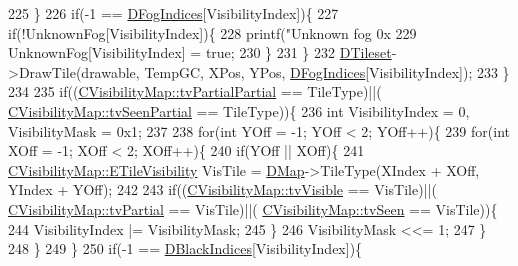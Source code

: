 \begin{DoxyCode}
225                 \}
226                 \textcolor{keywordflow}{if}(-1 == \hyperlink{classCFogRenderer_a2028e4642e756016819aab6567800af5}{DFogIndices}[VisibilityIndex])\{
227                     \textcolor{keywordflow}{if}(!UnknownFog[VisibilityIndex])\{
228                         printf(\textcolor{stringliteral}{"Unknown fog 0x%
229                         UnknownFog[VisibilityIndex] = \textcolor{keyword}{true};
230                     \}
231                 \}
232                 \hyperlink{classCFogRenderer_af9f3956c6e371f112ee1ce5decd7ae89}{DTileset}->DrawTile(drawable, TempGC, XPos, YPos, 
      \hyperlink{classCFogRenderer_a2028e4642e756016819aab6567800af5}{DFogIndices}[VisibilityIndex]);
233             \}
234             
235             \textcolor{keywordflow}{if}((\hyperlink{classCVisibilityMap_a6665f905da08825adbb0eee7bd1f2f30a75af969b6d667b802b64bacd8bca7b63}{CVisibilityMap::tvPartialPartial} == TileType)||(
      \hyperlink{classCVisibilityMap_a6665f905da08825adbb0eee7bd1f2f30a7f9292f5d7ed9e9497f8ef342c890466}{CVisibilityMap::tvSeenPartial} == TileType))\{
236                 \textcolor{keywordtype}{int} VisibilityIndex = 0, VisibilityMask = 0x1;
237                 
238                 \textcolor{keywordflow}{for}(\textcolor{keywordtype}{int} YOff = -1; YOff < 2; YOff++)\{
239                     \textcolor{keywordflow}{for}(\textcolor{keywordtype}{int} XOff = -1; XOff < 2; XOff++)\{
240                         \textcolor{keywordflow}{if}(YOff || XOff)\{
241                             \hyperlink{classCVisibilityMap_a6665f905da08825adbb0eee7bd1f2f30}{CVisibilityMap::ETileVisibility} VisTile = 
      \hyperlink{classCFogRenderer_a06be3616da23b5fce8ab3407b81788a4}{DMap}->TileType(XIndex + XOff, YIndex + YOff);
242                             
243                             \textcolor{keywordflow}{if}((\hyperlink{classCVisibilityMap_a6665f905da08825adbb0eee7bd1f2f30a3c881652ef7164aa086e595eef0ff5d6}{CVisibilityMap::tvVisible} == VisTile)||(
      \hyperlink{classCVisibilityMap_a6665f905da08825adbb0eee7bd1f2f30a0037f47075e3bde5e8e32dbd55754976}{CVisibilityMap::tvPartial} == VisTile)||(
      \hyperlink{classCVisibilityMap_a6665f905da08825adbb0eee7bd1f2f30ab7c30a117286ac3a8891862f6c1bb5c6}{CVisibilityMap::tvSeen} == VisTile))\{
244                                 VisibilityIndex |= VisibilityMask;   
245                             \}
246                             VisibilityMask <<= 1;
247                         \}
248                     \}
249                 \}
250                 \textcolor{keywordflow}{if}(-1 == \hyperlink{classCFogRenderer_a09e3b546abbe52cc9addd1edfcc5ea9c}{DBlackIndices}[VisibilityIndex])\{
}
\end{DoxyCode}
